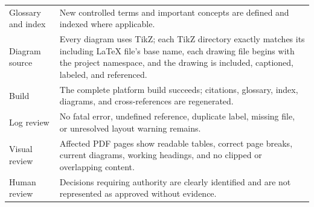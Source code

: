 \begin{tabularx}{\linewidth}{L{3.5cm}Y}
Glossary and index & New controlled terms and important concepts are defined and indexed where applicable.\\
Diagram source & Every diagram uses TikZ; each TikZ directory exactly matches its including LaTeX file's base name, each drawing file begins with the project namespace, and the drawing is included, captioned, labeled, and referenced.\\
Build & The complete platform build succeeds; citations, glossary, index, diagrams, and cross-references are regenerated.\\
Log review & No fatal error, undefined reference, duplicate label, missing file, or unresolved layout warning remains.\\
Visual review & Affected PDF pages show readable tables, correct page breaks, current diagrams, working headings, and no clipped or overlapping content.\\
Human review & Decisions requiring authority are clearly identified and are not represented as approved without evidence.\\
\end{tabularx}
\normalsize
